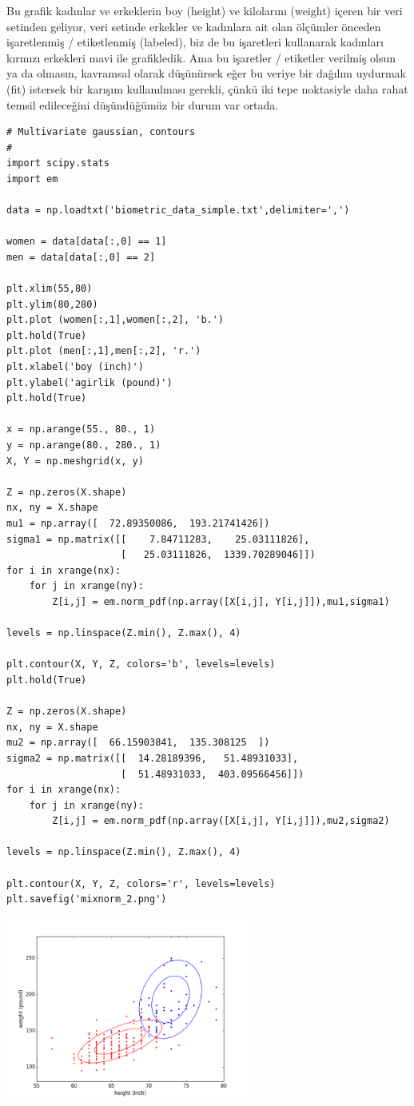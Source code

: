 \documentclass[12pt,fleqn]{article}\usepackage{../../common}
\begin{document}
Bu grafik kadınlar ve erkeklerin boy (height) ve kilolarını (weight) içeren
bir veri setinden geliyor, veri setinde erkekler ve kadınlara ait olan
ölçümler önceden işaretlenmiş / etiketlenmiş (labeled), biz de bu
işaretleri kullanarak kadınları kırmızı erkekleri mavi ile grafikledik. Ama
bu işaretler / etiketler verilmiş olsun ya da olmasın, kavramsal olarak
düşünürsek eğer bu veriye bir dağılım uydurmak (fit) istersek bir karışım
kullanılması gerekli, çünkü iki tepe noktasiyle daha rahat temsil
edileceğini düşündüğümüz bir durum var ortada.

\begin{verbatim}
# Multivariate gaussian, contours
#
import scipy.stats
import em

data = np.loadtxt('biometric_data_simple.txt',delimiter=',')

women = data[data[:,0] == 1]
men = data[data[:,0] == 2]

plt.xlim(55,80)
plt.ylim(80,280)
plt.plot (women[:,1],women[:,2], 'b.')
plt.hold(True)
plt.plot (men[:,1],men[:,2], 'r.')
plt.xlabel('boy (inch)')
plt.ylabel('agirlik (pound)')
plt.hold(True)

x = np.arange(55., 80., 1)
y = np.arange(80., 280., 1)
X, Y = np.meshgrid(x, y)

Z = np.zeros(X.shape)
nx, ny = X.shape
mu1 = np.array([  72.89350086,  193.21741426])
sigma1 = np.matrix([[    7.84711283,    25.03111826],
                    [   25.03111826,  1339.70289046]])
for i in xrange(nx):
    for j in xrange(ny):
        Z[i,j] = em.norm_pdf(np.array([X[i,j], Y[i,j]]),mu1,sigma1)
        
levels = np.linspace(Z.min(), Z.max(), 4)

plt.contour(X, Y, Z, colors='b', levels=levels)
plt.hold(True)

Z = np.zeros(X.shape)
nx, ny = X.shape
mu2 = np.array([  66.15903841,  135.308125  ])
sigma2 = np.matrix([[  14.28189396,   51.48931033],
                    [  51.48931033,  403.09566456]])
for i in xrange(nx):
    for j in xrange(ny):
        Z[i,j] = em.norm_pdf(np.array([X[i,j], Y[i,j]]),mu2,sigma2)
        
levels = np.linspace(Z.min(), Z.max(), 4)

plt.contour(X, Y, Z, colors='r', levels=levels)
plt.savefig('mixnorm_2.png')
\end{verbatim}

\includegraphics[height=6cm]{mixnorm_2.png}
\end{document}
